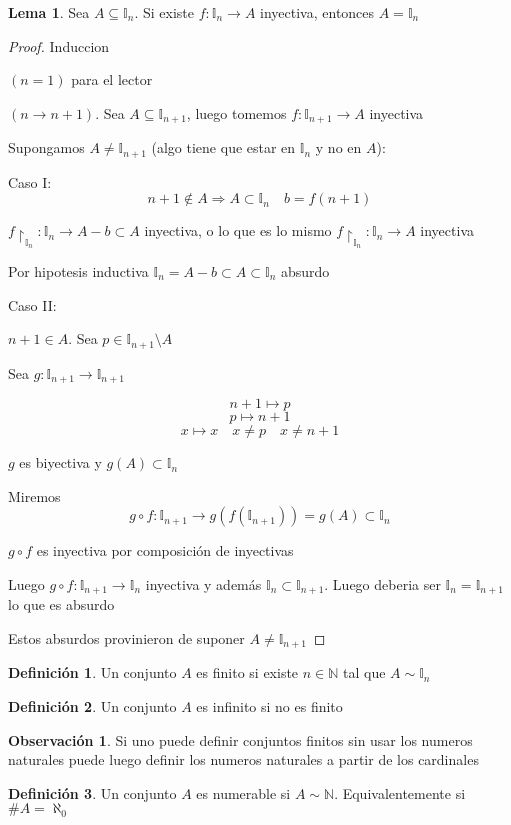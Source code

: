 \documentclass[12pt]{article}
\newcommand{\n}{\aleph_{0}}
\newcommand{\I}{\mathbb{I}}
\newcommand{\N}{\mathbb{N}}
\newcommand{\Ra}{\Rightarrow}
\newcommand{\ra}{\rightarrow}
\theoremstyle{definition}
\newtheorem{definition}{Definición}[section]
\newtheorem*{remark}{Observación}
\newtheorem{lemma}[theorem]{Lema}
\begin{document}
\begin{lemma}
  Sea $A \subseteq \I_{n}$. Si existe $f: \I_{n} \ra A$ inyectiva, entonces $A = \I_{n}$

  \begin{proof}
    Induccion

  $(n=1)$ para el lector

  $(n \ra n + 1) $. Sea $A \subseteq \I_{n+1}$, luego tomemos $f: \I_{n+1} \ra A$ inyectiva

  Supongamos $A \neq \I_{n+1}$ (algo tiene que estar en $\I_{n}$ y no en $A$):

    Caso I: $$n+1 \notin A \Ra A \subset \I_{n} \quad b = f(n+1)$$

    \begin{center}$f\restriction_{\I_{n}} : \I_{n} \ra A - {b} \subset A$ inyectiva, o lo que es lo mismo $f \restriction_{\I_{n}}:\I_{n} \ra A$ inyectiva \end{center}

    Por hipotesis inductiva $\I_{n} = A - {b} \subset A \subset \I_{n}$ absurdo

    Caso II: \begin{center} $n+1 \in A$. Sea $p \in \I_{n+1} \setminus A $ \end{center}

    Sea $g: \I_{n+1} \ra \I_{n+1}$
    
   $$n+1 \mapsto p$$
    $$p \mapsto n+1$$
  $$x \mapsto x \quad x \neq p \quad x \neq n+1$$

  $g$ es biyectiva  y $g(A) \subset \I_{n}$

  Miremos $$g \circ f: \I_{n+1} \ra g(f(\I_{n+1})) = g(A) \subset \I_{n} $$

  $g \circ f$ es inyectiva por composición de inyectivas

  Luego $g \circ f: \I_{n+1} \ra \I_{n}$ inyectiva y además $\I_{n} \subset \I_{n+1}$. Luego deberia ser $\I_{n} = \I_{n+1}$ lo que es absurdo

  Estos absurdos provinieron de suponer $A \neq \I_{n+1}$

  \end{proof}

  \begin{definition}
    Un conjunto $A$ es finito si existe $n \in \N $ tal que $A \sim \I_{n}$
  \end{definition}

  \begin{definition}
    Un conjunto $A$ es infinito si no es finito
  \end{definition}

  \begin{remark}
    Si uno puede definir conjuntos finitos sin usar los numeros naturales puede luego definir los numeros naturales a partir de los cardinales 
  \end{remark}

  \begin{definition}
    Un conjunto $A$ es numerable si $A \sim \N$. Equivalentemente si $\# A = \n$
    
  \end{definition}
\end{lemma}
\end{document}

